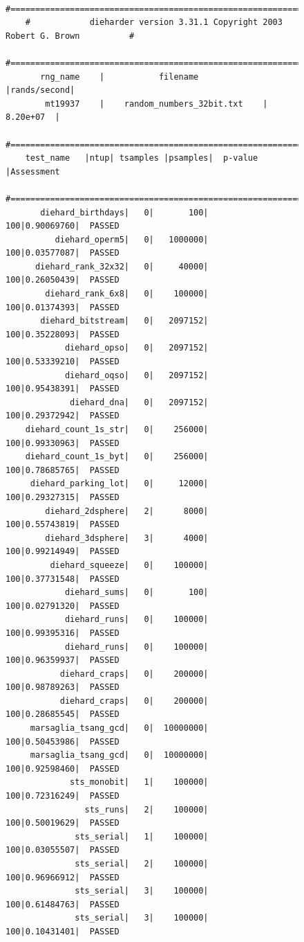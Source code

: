 \documentclass[11pt, a4paper, titlepage]{article}
\begin{document}
\begin{figure}[H]
    \fontsize{8pt}{10pt}\selectfont
    \begin{verbatim}
    #=============================================================================#
    #            dieharder version 3.31.1 Copyright 2003 Robert G. Brown          #
    #=============================================================================#
       rng_name    |           filename             |rands/second|
        mt19937    |    random_numbers_32bit.txt    |  8.20e+07  |
    #=============================================================================#
    test_name   |ntup| tsamples |psamples|  p-value |Assessment
    #=============================================================================#
       diehard_birthdays|   0|       100|     100|0.90069760|  PASSED
          diehard_operm5|   0|   1000000|     100|0.03577087|  PASSED
      diehard_rank_32x32|   0|     40000|     100|0.26050439|  PASSED
        diehard_rank_6x8|   0|    100000|     100|0.01374393|  PASSED
       diehard_bitstream|   0|   2097152|     100|0.35228093|  PASSED
            diehard_opso|   0|   2097152|     100|0.53339210|  PASSED
            diehard_oqso|   0|   2097152|     100|0.95438391|  PASSED
             diehard_dna|   0|   2097152|     100|0.29372942|  PASSED
    diehard_count_1s_str|   0|    256000|     100|0.99330963|  PASSED
    diehard_count_1s_byt|   0|    256000|     100|0.78685765|  PASSED
     diehard_parking_lot|   0|     12000|     100|0.29327315|  PASSED
        diehard_2dsphere|   2|      8000|     100|0.55743819|  PASSED
        diehard_3dsphere|   3|      4000|     100|0.99214949|  PASSED
         diehard_squeeze|   0|    100000|     100|0.37731548|  PASSED
            diehard_sums|   0|       100|     100|0.02791320|  PASSED
            diehard_runs|   0|    100000|     100|0.99395316|  PASSED
            diehard_runs|   0|    100000|     100|0.96359937|  PASSED
           diehard_craps|   0|    200000|     100|0.98789263|  PASSED
           diehard_craps|   0|    200000|     100|0.28685545|  PASSED
     marsaglia_tsang_gcd|   0|  10000000|     100|0.50453986|  PASSED
     marsaglia_tsang_gcd|   0|  10000000|     100|0.92598460|  PASSED
             sts_monobit|   1|    100000|     100|0.72316249|  PASSED
                sts_runs|   2|    100000|     100|0.50019629|  PASSED
              sts_serial|   1|    100000|     100|0.03055507|  PASSED
              sts_serial|   2|    100000|     100|0.96966912|  PASSED
              sts_serial|   3|    100000|     100|0.61484763|  PASSED
              sts_serial|   3|    100000|     100|0.10431401|  PASSED

\end{verbatim}
\end{figure}
\end{document}
